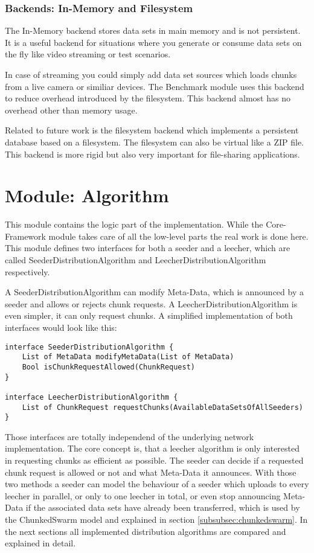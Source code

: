 \subsubsection{Backends: In-Memory and Filesystem}
The In-Memory backend stores data sets in main memory and is not persistent. It is a useful backend for situations where you generate or consume data sets on the fly like video streaming or test scenarios.

In case of streaming you could simply add data set sources which loads chunks from a live camera or similiar devices. The Benchmark module uses this backend to reduce overhead introduced by the filesystem. This backend almost has no overhead other than memory usage.

Related to future work is the filesystem backend which implements a persistent database based on a filesystem. The filesystem can also be virtual like a ZIP file. This backend is more rigid but also very important for file-sharing applications.

\cleardoublepage
\section{Module: Algorithm}
\label{sec:algorithm}
This module contains the logic part of the implementation. While the Core-Framework module takes care of all the low-level parts the real work is done here. This module defines two interfaces for both a seeder and a leecher, which are called SeederDistributionAlgorithm and LeecherDistributionAlgorithm respectively. 

A SeederDistributionAlgorithm can modify Meta-Data, which is announced by a seeder and allows or rejects chunk requests. A LeecherDistributionAlgorithm is even simpler, it can only request chunks. A simplified implementation of both interfaces would look like this:

\begin{verbatim}
interface SeederDistributionAlgorithm {
    List of MetaData modifyMetaData(List of MetaData)
    Bool isChunkRequestAllowed(ChunkRequest)
}

interface LeecherDistributionAlgorithm {
    List of ChunkRequest requestChunks(AvailableDataSetsOfAllSeeders)
}
\end{verbatim}

Those interfaces are totally independend of the underlying network implementation. The core concept is, that a leecher algorithm is only interested in requesting chunks as efficient as possible. The seeder can decide if a requested chunk request is allowed or not and what Meta-Data it announces. With those two methods a seeder can model the behaviour of a seeder which uploads to every leecher in parallel, or only to one leecher in total, or even stop announcing Meta-Data if the associated data sets have already been transferred, which is used by the ChunkedSwarm model and explained in section \ref{subsubsec:chunkedswarm}. In the next sections all implemented distribution algorithms are compared and explained in detail.

